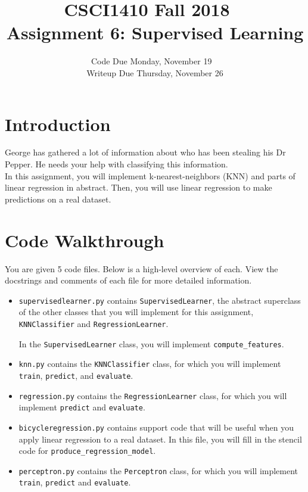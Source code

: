\documentclass{article}
\title{CSCI1410 Fall 2018 ~\\
Assignment 6: Supervised Learning}
\date{Code Due Monday, November 19 ~\\
Writeup Due Thursday, November 26}
\begin{document}
   \maketitle

\section{Introduction}

George has gathered a lot of information about who has been stealing his Dr Pepper. He needs your help with classifying this information. ~\\

In this assignment, you will implement k-nearest-neighbors (KNN) and parts of linear regression in abstract.
Then, you will use linear regression to make predictions on a real dataset.

\section{Code Walkthrough}
You are given 5 code files.
Below is a high-level overview of each.
View the docstrings and comments of each file for more detailed information.

\begin{itemize}
\item \verb|supervisedlearner.py|
contains \verb|SupervisedLearner|, the abstract superclass of the other classes that you will implement for this assignment, \verb|KNNClassifier| and \verb|RegressionLearner|.

In the \verb|SupervisedLearner| class, you will implement \verb|compute_features|.

\item \verb|knn.py|
contains the \verb|KNNClassifier| class, for which you will implement \verb|train|, \verb|predict|, and \verb|evaluate|.

\item \verb|regression.py|
contains the \verb|RegressionLearner| class, for which you will implement \verb|predict| and \verb|evaluate|.

\item \verb|bicycleregression.py|
contains support code that will be useful when you apply linear regression to a real dataset.
In this file, you will fill in the stencil code for \verb|produce_regression_model|.

\item \verb|perceptron.py| contains the \verb|Perceptron| class, for which you will implement \verb|train|, \verb|predict| and \verb|evaluate|.
\end{itemize}
\end{document}
